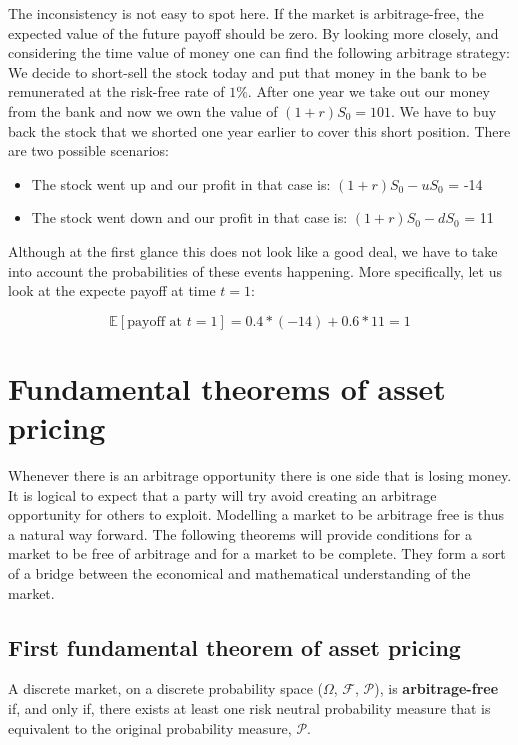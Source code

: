 \documentclass[times, utf8, diplomski]{fer}
\begin{document}
The inconsistency is not easy to spot here. If the market is arbitrage-free, the expected value of the future payoff should be zero. By looking more closely, and considering the time value of money one can find the following arbitrage strategy:
We decide to short-sell the stock today and put that money in the bank to be remunerated at the risk-free rate of $1\%$. After one year we take out our money from the bank and now we own the value of $(1+r)S_0 = 101$. We have to buy back the stock that we shorted one year earlier to cover this short position. There are two possible scenarios:
\hfill \break
\begin{itemize}
	\item The stock went up and our profit in that case is: $(1+r)S_0 - uS_0$ = -14
	\item The stock went down and our profit in that case is: $(1+r)S_0 - dS_0$ = 11
\end{itemize}
\hfill \break
Although at the first glance this does not look like a good deal, we have to take into account the probabilities of these events happening. More specifically, let us look at the expecte payoff at time $t=1$:

$$\mathbb{E}[\text{payoff at } t=1] = 0.4 * (-14) + 0.6 * 11 = 1$$

\newpage
\section{Fundamental theorems of asset pricing}
Whenever there is an arbitrage opportunity there is one side that is losing money. It is logical to expect that a party will try avoid creating an arbitrage opportunity for others to exploit. Modelling a market to be arbitrage free is thus a natural way forward. The following theorems will provide conditions for a market to be free of arbitrage and for a market to be complete. They form a sort of a bridge between the economical and mathematical understanding of the market.
\subsection{First fundamental theorem of asset pricing}
\begin{theorem} \label{tm:ftap1}
	A discrete market, on a discrete probability space ($\Omega$, $\mathcal{F}$, $\mathcal{P}$), is \textbf{arbitrage-free} if, and only if, there exists at least one risk neutral probability measure that is equivalent to the original probability measure, $\mathcal{P}$.
\end{theorem}
\end{document}
